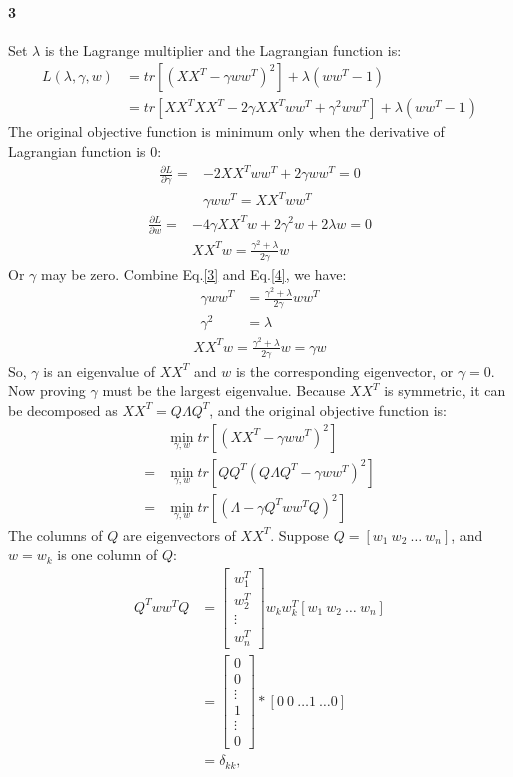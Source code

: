 \documentclass[22pt]{article}
\begin{document}
	\paragraph{3}Set $\lambda$ is the Lagrange multiplier and the Lagrangian function is:
	\begin{align}
		L(\lambda,\gamma,w) & = tr[(XX^T-	\gamma ww^T)^2] + \lambda (ww^T-1)\\
		& = tr[XX^TXX^T - 2 \gamma XX^Tww^T+ \gamma^2 ww^T] + \lambda (ww^T-1) 
	\end{align}
	The original objective function is minimum only when the derivative of Lagrangian function is 0:
	\begin{align}
		\frac{\partial L}{\partial \gamma} = & -2 XX^Tww^T + 2\gamma ww^T = 0\\
		& \gamma ww^T = XX^Tww^T\label{3}
	\end{align}
	\begin{align}
		\frac{\partial L}{\partial w} = & -4 \gamma XX^Tw + 2 \gamma^2 w + 2\lambda w = 0\\
		& XX^Tw = \frac{\gamma^2+\lambda}{2	\gamma}w  \label{4}
	\end{align}
	Or $\gamma$ may be zero. Combine Eq.\ref{3} and Eq.\ref{4}, we have:
	\begin{align}
		\gamma ww^T & = \frac{\gamma^2+\lambda}{2	\gamma}ww^T\\
		\gamma^2 &= \lambda
	\end{align}
	\begin{align}
		XX^Tw = \frac{\gamma^2+\lambda}{2\gamma}w = \gamma w
	\end{align}
	So, $\gamma$ is an eigenvalue of $XX^T$ and $w$ is the corresponding eigenvector, or $\gamma = 0$. Now proving $\gamma$ must be the largest eigenvalue. Because $XX^T$ is symmetric, it can be decomposed as $XX^T = Q \Lambda Q^T$, and the original objective function is:
	\begin{align}
		& \min_{\gamma,w} tr[(XX^T-	\gamma ww^T)^2]\\
		= & \min_{\gamma,w} tr[QQ^T(Q \Lambda Q^T-	\gamma ww^T)^2]\\
		= & \min_{\gamma,w} tr[(\Lambda -	\gamma Q^T ww^TQ)^2]
	\end{align}
	The columns of $Q$ are eigenvectors of $XX^T$. Suppose $Q = [w_1\ w_2 \ \dots \ w_n]$, and $w = w_k$ is one column of $Q$:
		\begin{align}
			Q^T ww^TQ & = \left[ \begin{array}{c} w_1^T\\ w_2^T\\ \vdots\\ w_n^T \end{array} \right]w_kw_k^T[w_1\ w_2 \ \dots \ w_n]\\
			& = \left[ \begin{array}{c} 0\\ 0\\ \vdots\\ 1\\ \vdots\\ 0 \end{array} \right]*[0\ 0\ \dots 1\ \dots 0]\\
			& = \delta_{kk},
		\end{align}
\end{document}
